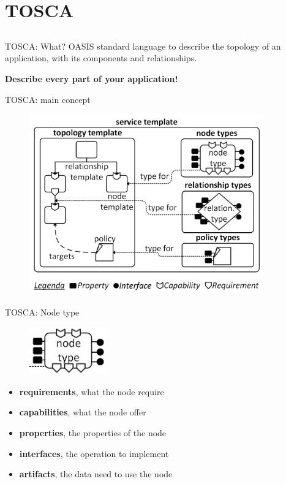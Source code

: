 \documentclass{beamer}
\begin{document}
\section{TOSCA}\subsection*{}
  \begin{frame}{TOSCA: What?}
    OASIS standard language to describe the topology of an application, with its components and relationships.
    \bigskip

    \centering
    \textbf{Describe every part of your application!}
  \end{frame}

  \begin{frame}{TOSCA: main concept}
    \begin{figure}
      \includegraphics[width=0.9\textwidth]{img/service-template.png}
    \end{figure}
  \end{frame}

  \begin{frame}{TOSCA: Node type}
    \begin{figure}
      \includegraphics[width=0.3\textwidth]{img/tosca_node_type.png}
    \end{figure}
    \begin{itemize}
      \item \textbf{requirements}, what the node require
      \item \textbf{capabilities}, what the node offer
      \item \textbf{properties}, the properties of the node
      \item \textbf{interfaces}, the operation to implement
      \item \textbf{artifacts}, the data need to use the node
    \end{itemize}
  \end{frame}
\end{document}
